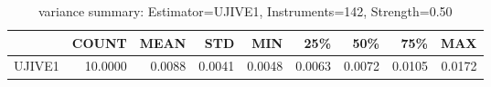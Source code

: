 \begin{table}[ht]
\centering
\caption{variance summary: Estimator=UJIVE1, Instruments=142, Strength=0.50}
\begin{tabular}{lrrrrrrrr}
\toprule
 & COUNT & MEAN & STD & MIN & 25\% & 50\% & 75\% & MAX \\
\midrule
UJIVE1 & 10.0000 & 0.0088 & 0.0041 & 0.0048 & 0.0063 & 0.0072 & 0.0105 & 0.0172 \\
\bottomrule
\end{tabular}
\end{table}

